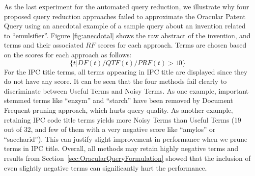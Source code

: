 As the last experiment for the automated query reduction, we illustrate why four proposed query reduction approaches failed to approximate the Oracular Patent Query using an anecdotal example of a sample query about an invention related to ``emulsifier''. 
Figure \ref{fig:anecdotal} shows the raw abstract of the invention, and terms and their associated $\mathit{RF}$ scores for each approach. 
Terms are chosen based on the scores for each approach as follows: 
\begin{displaymath}\{t| DF(t)/QTF(t)/PRF(t)>10\}\end{displaymath}
For the IPC title terms, all terms appearing in IPC title are displayed since they do not have any score.   
It can be seen that the four methods fail clearly to discriminate between Useful Terms and Noisy Terms. As one example, important stemmed terms like ``enzym'' and ``starch'' have been removed by Document Frequent pruning approach, which hurts query quality.  As another example, retaining IPC code title terms yields more Noisy Terms than Useful Terms (19 out of 32, and few of them with a very negative score like ``amylos'' or ``saccharid''). This can justify slight improvement in performance when we prune terms in IPC title. Overall, all methods may retain highly negative terms and results from Section~\ref{sec:OracularQueryFormulation} showed that the inclusion of even slightly negative terms can significantly hurt the performance.
